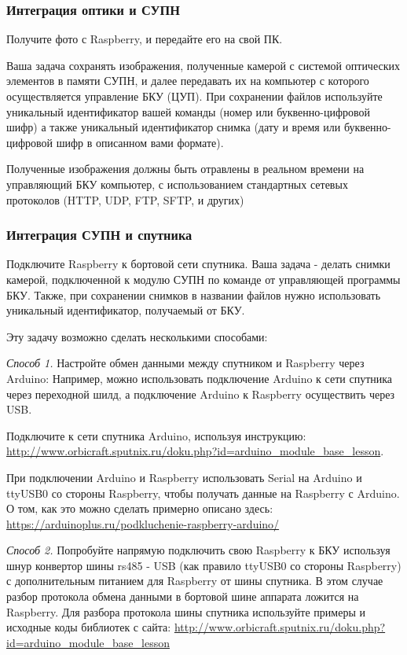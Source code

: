 \subsubsection*{Интеграция оптики и СУПН}

Получите фото с Raspberry, и передайте его на свой ПК.

Ваша задача сохранять изображения, полученные камерой с системой оптических элементов в памяти СУПН, и далее передавать их на компьютер с которого осуществляется управление БКУ (ЦУП). При сохранении файлов используйте уникальный идентификатор вашей команды (номер или буквенно-цифровой шифр) а также уникальный идентификатор снимка (дату и время или буквенно-цифровой шифр в описанном вами формате). 

Полученные изображения должны быть отравлены в реальном времени на управляющий БКУ компьютер, с использованием стандартных сетевых протоколов (HTTP, UDP, FTP, SFTP, и других)

\subsubsection*{Интеграция СУПН и спутника}

Подключите Raspberry к бортовой сети спутника. Ваша задача  - делать снимки камерой, подключенной к модулю СУПН по команде от управляющей программы БКУ. Также, при сохранении снимков в названии файлов нужно использовать уникальный идентификатор, получаемый от БКУ.  

Эту задачу возможно сделать несколькими способами:

\textit{Способ 1.} Настройте обмен данными между спутником и Raspberry через Arduino: 
Например, можно использовать подключение Arduino к сети спутника через переходной шилд, а подключение Arduino к Raspberry осуществить через USB.

Подключите к сети спутника Arduino, используя инструкцию: \url{http://www.orbicraft.sputnix.ru/doku.php?id=arduino_module_base_lesson}.

При подключении Arduino и Raspberry использовать Serial на Arduino и ttyUSB0 со стороны Raspberry, чтобы получать данные на Raspberry с Arduino. О том, как это можно сделать примерно описано здесь: \url{https://arduinoplus.ru/podkluchenie-raspberry-arduino/}

\textit{Способ 2.} Попробуйте напрямую подключить свою Raspberry к БКУ используя шнур конвертор шины rs485 - USB (как правило ttyUSB0 со стороны Raspberry) с дополнительным питанием для Raspberry от шины спутника. В этом случае разбор протокола обмена данными в бортовой шине аппарата ложится на Raspberry. Для разбора протокола шины спутника используйте примеры и исходные коды библиотек с сайта: \url{http://www.orbicraft.sputnix.ru/doku.php?id=arduino_module_base_lesson}

